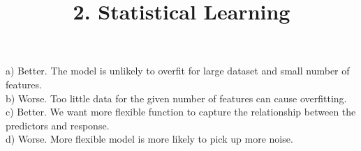 \documentclass{article}
\begin{document}
\title{2. Statistical Learning}
\date{}
\maketitle
\section{}

a) Better. The model is unlikely to overfit for large dataset and small number of features. \\
b) Worse. Too little data for the given number of features can cause overfitting. \\
c) Better. We want more flexible function to capture the relationship between the predictors and response. \\
d) Worse. More flexible model is more likely to pick up more noise. \\
\end{document}
